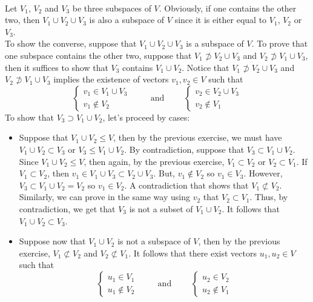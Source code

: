 \begin{solution}
    \\ Let $V_1$, $V_2$ and $V_3$ be three subspaces of $V$. Obviously, if one contains the other two, then $V_1 \cup V_2 \cup V_3$ is also a subspace of $V$ since it is either equal to $V_1$, $V_2$ or $V_3$.\\
    To show the converse, suppose that $V_1 \cup V_2 \cup V_3$ is a subspace of $V$. To prove that one subspace contains the other two, suppose that $V_1 \not\supset V_2 \cup V_3$ and $V_2 \not\supset V_1 \cup V_3$, then it suffices to show that $V_3$ contains $V_1 \cup V_2$. Notice that $V_1 \not\supset V_2 \cup V_3$ and $V_2 \not\supset V_1 \cup V_3$ implies the existence of vectors $v_1, v_2 \in V$ such that
    $$\begin{cases} v_1 \in V_1 \cup V_3 \\ v_1 \notin V_2\end{cases} \qquad \text{ and } \qquad \begin{cases} v_2 \in V_2 \cup V_3 \\ v_2 \notin V_1\end{cases}$$
    To show that $V_3 \supset V_1 \cup V_2$, let's proceed by cases:
    \begin{itemize}
        \item Suppose that $V_1 \cup V_2 \leq V$, then by the previous exercise, we must have $V_1 \cup V_2 \subset V_3$ or $V_3 \leq V_1 \cup V_2$. By contradiction, suppose that $V_3 \subset V_1 \cup V_2$. Since $V_1 \cup V_2 \leq V$, then again, by the previous exercise, $V_1 \subset V_2$ or $V_2 \subset V_1$. If $V_1 \subset V_2$, then $v_1 \in V_1 \cup V_3 \subset V_2 \cup V_3$. But, $v_1 \notin V_2$ so $v_1 \in V_3$. However, $V_3 \subset V_1 \cup V_2 = V_2$ so $v_1 \in V_2$. A contradiction that shows that $V_1 \not\subset V_2$. Similarly, we can prove in the same way using $v_2$ that $V_2 \subset V_1$. Thus, by contradiction, we get that $V_3$ is not a subset of $V_1 \cup V_2$. It follows that $V_1 \cup V_2 \subset V_3$.
        \item Suppose now that $V_1 \cup V_2$ is not a subspace of $V$, then by the previous exercise, $V_1 \not\subset V_2$ and $V_2 \not\subset V_1$. It follows that there exist vectors $u_1, u_2 \in V$ such that
        $$\begin{cases} u_1 \in V_1 \\ u_1 \notin V_2\end{cases} \qquad \text{ and } \qquad \begin{cases} u_2 \in V_2 \\ u_2 \notin V_1\end{cases}$$

\end{itemize}
\end{solution}
